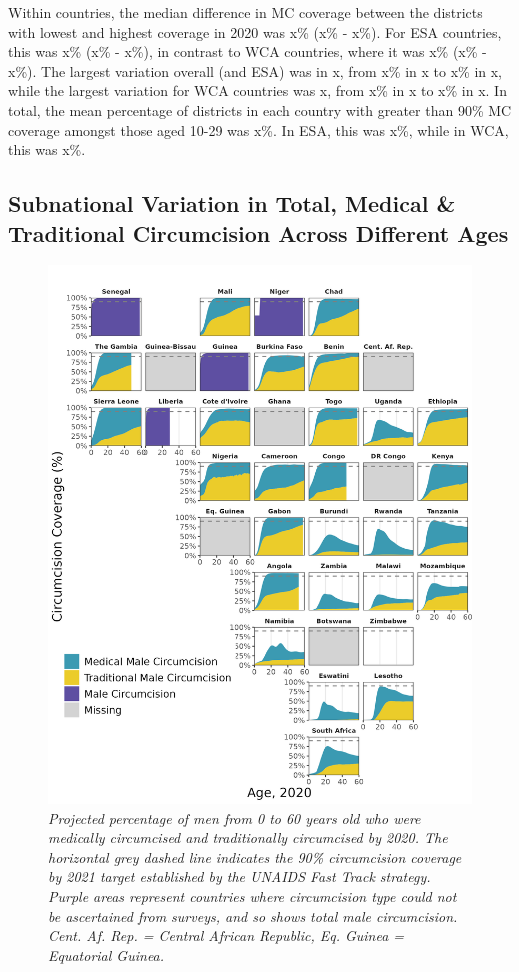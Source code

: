 \documentclass{article}
\begin{document}

Within countries, the median difference in MC coverage between the districts with lowest and highest coverage in 2020 was x\% (x\% - x\%).
For ESA countries, this was x\% (x\% - x\%), in contrast to WCA countries, where it was x\% (x\% - x\%).
The largest variation overall (and ESA) was in x, from x\% in x to x\% in x, while the largest variation for WCA countries was x, from x\% in x to x\% in x. 
In total, the mean percentage of districts in each country with greater than 90\% MC coverage amongst those aged 10-29 was x\%. In ESA, this was x\%, while in WCA, this was x\%. 


\subsection{Subnational Variation in Total, Medical \& Traditional Circumcision Across Different Ages}
\label{sec:org92e0f37}

\begin{figure}[H]
    \centering
    \includegraphics[width=.9\linewidth]
    {plots/04_geo_age.png}
    \caption{\emph{Projected percentage of men from 0 to 60 years old who were medically circumcised and traditionally circumcised by 2020. The horizontal grey dashed line indicates the 90\% circumcision coverage by 2021 target established by the UNAIDS Fast Track strategy. Purple areas represent countries where circumcision type could not be ascertained from surveys, and so shows total male circumcision. Cent. Af. Rep. = Central African Republic, Eq. Guinea = Equatorial Guinea.}}
\end{figure}
\end{document}
